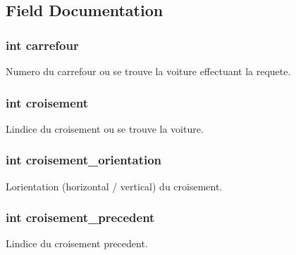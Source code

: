 \subsection{Field Documentation}
\hypertarget{struct_requete_a49c1ca0385a5b276704a97cdceef2d83}{}
\subsubsection[{carrefour}]{\setlength{\rightskip}{0pt plus 5cm}int carrefour}\label{struct_requete_a49c1ca0385a5b276704a97cdceef2d83}
Numero du carrefour ou se trouve la voiture effectuant la requete. \hypertarget{struct_requete_a558796b11448541e07f81ec0df5bf2bc}{}
\subsubsection[{croisement}]{\setlength{\rightskip}{0pt plus 5cm}int croisement}\label{struct_requete_a558796b11448541e07f81ec0df5bf2bc}
L\textquotesingle{}indice du croisement ou se trouve la voiture. \hypertarget{struct_requete_a0b2b0b49307840329ff724e792091c94}{}
\subsubsection[{croisement\+\_\+orientation}]{\setlength{\rightskip}{0pt plus 5cm}int croisement\+\_\+orientation}\label{struct_requete_a0b2b0b49307840329ff724e792091c94}
L\textquotesingle{}orientation (horizontal / vertical) du croisement. \hypertarget{struct_requete_ab1a425fa3b56a376a3fcac1f4491b1d0}{}
\subsubsection[{croisement\+\_\+precedent}]{\setlength{\rightskip}{0pt plus 5cm}int croisement\+\_\+precedent}\label{struct_requete_ab1a425fa3b56a376a3fcac1f4491b1d0}
L\textquotesingle{}indice du croisement precedent. \hypertarget{struct_requete_a9ee9e497cd0d78d4214a6507a550239c}{}
